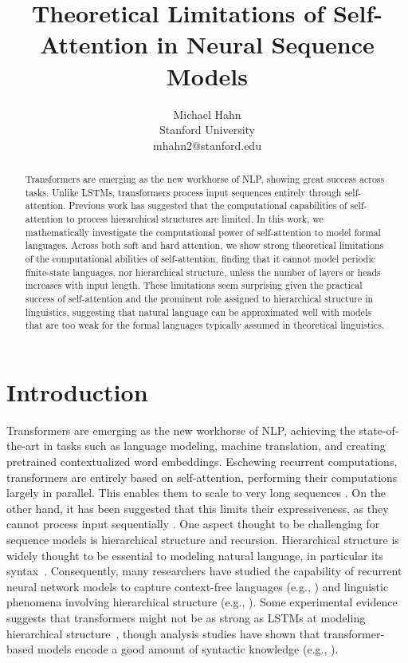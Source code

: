 \documentclass[11pt,a4paper]{article}
\title{Theoretical Limitations of Self-Attention in Neural Sequence Models}
\author{Michael Hahn \\ Stanford University \\ {\sf mhahn2@stanford.edu}}
\begin{document}
\maketitle
\begin{abstract}
Transformers are emerging as the new workhorse of NLP, showing great success across tasks.
Unlike LSTMs, transformers process input sequences entirely through self-attention.
Previous work has suggested that the computational capabilities of self-attention to process hierarchical structures are limited.
In this work, we mathematically investigate the computational power of self-attention to model formal languages.
Across both soft and hard attention, we show strong theoretical limitations of the computational abilities of self-attention, finding that it cannot model periodic finite-state languages, nor hierarchical structure, unless the number of layers or heads increases with input length.
These limitations seem surprising given the practical success of self-attention and the prominent role assigned to hierarchical structure in linguistics, suggesting that natural language can be approximated well with models that are too weak for the formal languages typically assumed in theoretical linguistics. 
\end{abstract}

\section{Introduction}

Transformers are emerging as the new workhorse of NLP, achieving the state-of-the-art in tasks such as language modeling, machine translation, and creating pretrained contextualized word embeddings.
Eschewing recurrent computations, transformers are entirely based on self-attention, performing their computations largely in parallel.
This enables them to scale to very long sequences \cite{vaswani2017attention,dai2019transformer,child2019generating}.
On the other hand, it has been suggested that this limits their expressiveness, as they cannot process input sequentially \cite{tran2018importance,dehghani2018universal,shen2018disan,chen2018best,hao2019modeling}.
One aspect thought to be challenging for sequence models is hierarchical structure and recursion.
Hierarchical structure is widely thought to be essential to modeling natural language, in particular its syntax~\cite{everaert2015structures}.
Consequently, many researchers have studied the capability of recurrent neural network models to capture context-free languages (e.g., \citet{kalinke1998computation,gers2001lstm,gruning2006stack,weiss2018practical,sennhauser2018evaluating,korsky2019computational}) and linguistic phenomena involving hierarchical structure (e.g., \citet{linzen2016assessing,gulordava2018colorless}).
Some experimental evidence suggests that transformers might not be as strong as LSTMs at modeling hierarchical structure~\cite{tran2018importance}, though analysis studies have shown that transformer-based models encode a good amount of syntactic knowledge (e.g., \citet{clark2019bert,lin2019open,tenney2019bert}).
\end{document}
